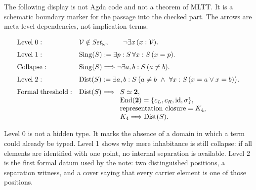 \documentclass[11pt]{article}
\begin{document}
The following display is not Agda code and not a theorem of MLTT.  It
is a schematic boundary marker for the passage into the checked part.
The arrows are meta-level dependencies, not implication terms.

\[
\begin{array}{ll}
\mathrm{Level\;0:} &
  \mathcal{V} \notin \mathit{Set}_\omega,
  \qquad \neg\exists x\,(x : \mathcal{V}).
\\[0.6em]
\mathrm{Level\;1:} &
  \mathrm{Sing}(S) :=
  \exists p:S\,\forall x:S\,(x = p).
\\[0.6em]
\mathrm{Collapse:} &
  \mathrm{Sing}(S)
  \Longrightarrow
  \neg\exists a,b:S\,(a \neq b).
\\[0.6em]
\mathrm{Level\;2:} &
  \mathrm{Dist}(S) :=
  \exists a,b:S\,
  \bigl(a \neq b\ \wedge\ \forall x:S\,(x=a \vee x=b)\bigr).
\\[0.6em]
\mathrm{Formal\;threshold:} &
  \mathrm{Dist}(S)
  \Longrightarrow
  \begin{array}[t]{l}
  S \simeq \mathbf{2},\\
  \mathrm{End}(\mathbf{2}) =
    \{c_L,c_R,\mathrm{id},\sigma\},\\
  \mathrm{representation\ closure} = K_4,\\
  K_4 \Longrightarrow \mathrm{Dist}(S).
  \end{array}
\end{array}
\]

\begin{center}
\end{center}

Level 0 is not a hidden type.  It marks the absence of a domain in which
a term could already be typed.  Level 1 shows why mere inhabitance is
still collapse: if all elements are identified with one point, no
internal separation is available.  Level 2 is the first formal datum used
by the note: two distinguished positions, a separation witness, and a
cover saying that every carrier element is one of those positions.
\end{document}
